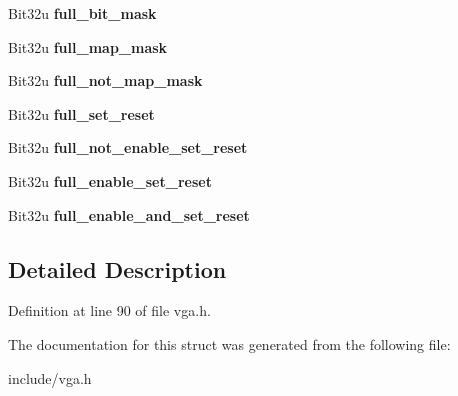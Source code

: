 \begin{DoxyCompactItemize}
\item 
\hypertarget{structVGA__Config_aeafb31cb767815375d30a6f0ba48e319}{Bit32u {\bfseries full\-\_\-bit\-\_\-mask}}\label{structVGA__Config_aeafb31cb767815375d30a6f0ba48e319}

\item 
\hypertarget{structVGA__Config_a4b6aad5a5153cac8c62619fec4fe15b4}{Bit32u {\bfseries full\-\_\-map\-\_\-mask}}\label{structVGA__Config_a4b6aad5a5153cac8c62619fec4fe15b4}

\item 
\hypertarget{structVGA__Config_a9621b79f2d85534101795b9a38e6c165}{Bit32u {\bfseries full\-\_\-not\-\_\-map\-\_\-mask}}\label{structVGA__Config_a9621b79f2d85534101795b9a38e6c165}

\item 
\hypertarget{structVGA__Config_ac7477048acf903ad2b40036fd7e17f8e}{Bit32u {\bfseries full\-\_\-set\-\_\-reset}}\label{structVGA__Config_ac7477048acf903ad2b40036fd7e17f8e}

\item 
\hypertarget{structVGA__Config_a7317f0353f9262ed950c47779ead4a45}{Bit32u {\bfseries full\-\_\-not\-\_\-enable\-\_\-set\-\_\-reset}}\label{structVGA__Config_a7317f0353f9262ed950c47779ead4a45}

\item 
\hypertarget{structVGA__Config_a045f0b43adea277828837e3cc956000e}{Bit32u {\bfseries full\-\_\-enable\-\_\-set\-\_\-reset}}\label{structVGA__Config_a045f0b43adea277828837e3cc956000e}

\item 
\hypertarget{structVGA__Config_ac1a974050a7c80f93935ad23fc5ba1f5}{Bit32u {\bfseries full\-\_\-enable\-\_\-and\-\_\-set\-\_\-reset}}\label{structVGA__Config_ac1a974050a7c80f93935ad23fc5ba1f5}

\end{DoxyCompactItemize}


\subsection{Detailed Description}


Definition at line 90 of file vga.\-h.



The documentation for this struct was generated from the following file\-:\begin{DoxyCompactItemize}
\item 
include/vga.\-h\end{DoxyCompactItemize}
